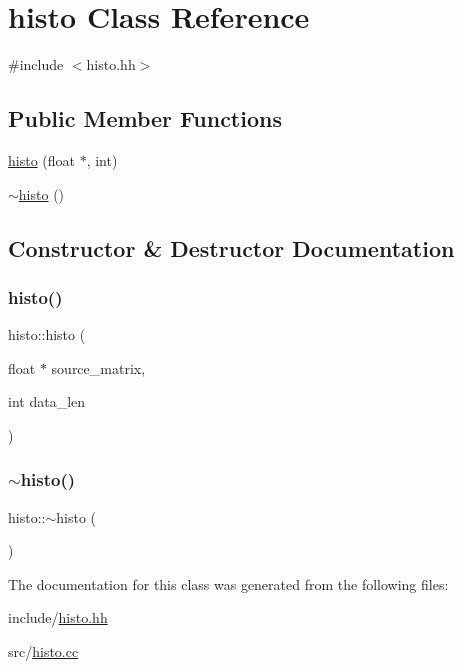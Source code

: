 \hypertarget{classhisto}{}\section{histo Class Reference}
\label{classhisto}


{\ttfamily \#include $<$histo.\+hh$>$}

\subsection*{Public Member Functions}
\begin{DoxyCompactItemize}
\item 
\mbox{\hyperlink{classhisto_a2a23e00b9fe044d7fcd38f12142e5c8d}{histo}} (float $\ast$, int)
\item 
\mbox{\hyperlink{classhisto_a385c60385f4f8d1c67050facb05ffc98}{$\sim$histo}} ()
\end{DoxyCompactItemize}


\subsection{Constructor \& Destructor Documentation}
\mbox{\label{classhisto_a2a23e00b9fe044d7fcd38f12142e5c8d}} 
\subsubsection{\texorpdfstring{histo()}{histo()}}
{\footnotesize\ttfamily histo\+::histo (\begin{DoxyParamCaption}\item[{float $\ast$}]{source\+\_\+matrix,  }\item[{int}]{data\+\_\+len }\end{DoxyParamCaption})}

\mbox{\label{classhisto_a385c60385f4f8d1c67050facb05ffc98}} 
\subsubsection{\texorpdfstring{$\sim$histo()}{~histo()}}
{\footnotesize\ttfamily histo\+::$\sim$histo (\begin{DoxyParamCaption}{ }\end{DoxyParamCaption})}



The documentation for this class was generated from the following files\+:\begin{DoxyCompactItemize}
\item 
include/\mbox{\hyperlink{histo_8hh}{histo.\+hh}}\item 
src/\mbox{\hyperlink{histo_8cc}{histo.\+cc}}\end{DoxyCompactItemize}
